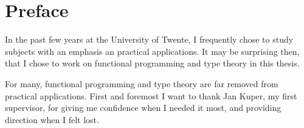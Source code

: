 \chapter{Preface}

In the past few years at the University of Twente, I frequently chose to study subjects with an emphasis an practical applications.
It may be surprising then, that I chose to work on functional programming and type theory in this thesis.

For many, functional programming and type theory are far removed from practical applications.
First and foremost I want to thank Jan Kuper, my first supervisor, for giving me confidence when I needed it most, and providing direction when I felt lost.

